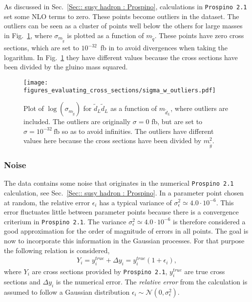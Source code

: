 \documentclass[twoside,english]{uiofysmaster}
\begin{document}
{{As discussed in Sec.~\ref{Sec:: susy hadron : Prospino}, calculations in \verb|Prospino 2.1| set some NLO terms to zero. These points become outliers in the dataset. The outliers can be seen as a cluster of points well below the others for large masses in Fig.~\ref{Fig:: evaluating cross : sigma w outliers}, where $\sigma_{m_{\widetilde{g}}}$ is plotted as a function of $m_{\widetilde{q}}$. These points have zero cross sections, which are set to $10^{-32}$~fb in to avoid divergences when taking the logarithm. In Fig.~\ref{Fig:: evaluating cross : sigma w outliers} they have different values because the cross sections have been divided by the gluino mass squared.

\begin{figure}
\centering
\texttt{[image: figures\_evaluating\_cross\_sections/sigma\_w\_outliers.pdf]}
\caption{Plot of $\log( \sigma_{m_{\widetilde{g}}})$ for $\widetilde{d}_L \widetilde{d}_L$ as a function of $m_{\widetilde{d}_L}$, where outliers are included. The outliers are originally $\sigma=0$ fb, but are set to $\sigma =10^{-32}~\mathrm{fb}$ so as to avoid infinities. The outliers have different values here because the cross sections have been divided by $m_{\tilde{g}}^2$.}
\label{Fig:: evaluating cross : sigma w outliers}
\end{figure}


\subsubsection{Noise}\label{Sec:: evaluating cross : Noise in dataset}

The data contains some noise that originates in the numerical \verb|Prospino 2.1| calculation, see Sec.~\ref{Sec:: susy hadron : Prospino}. In a parameter point chosen at random, the relative error $\epsilon_i$ has a typical variance of $\sigma^2_{\epsilon} \simeq 4.0 \cdot 10^{-6}$. This error fluctuates little between parameter points because there is a convergence criterium in \verb|Prospino 2.1|. The variance $\sigma^2_{\epsilon} \simeq 4.0 \cdot 10^{-6}$ is therefore considered a good approximation for the order of magnitude of errors in all points. The goal is now to incorporate this information in the Gaussian processes. For that purpose the following relation is considered,
\begin{align}\label{Eq:: cross section w/ error}
Y_i = y^{true}_i + \Delta y_i = y_i^{true}(1 + \epsilon_i),
\end{align}
where $Y_i$ are cross sections provided by \verb|Prospino 2.1|, $y_i^{true}$ are true cross sections and $\Delta y_i$ is the numerical error. The \textit{relative error} from the calculation is assumed to follow a Gaussian distribution $\epsilon_i \sim \mathcal{N}(0, \sigma_{\epsilon}^2)$. 

}}
\end{document}
